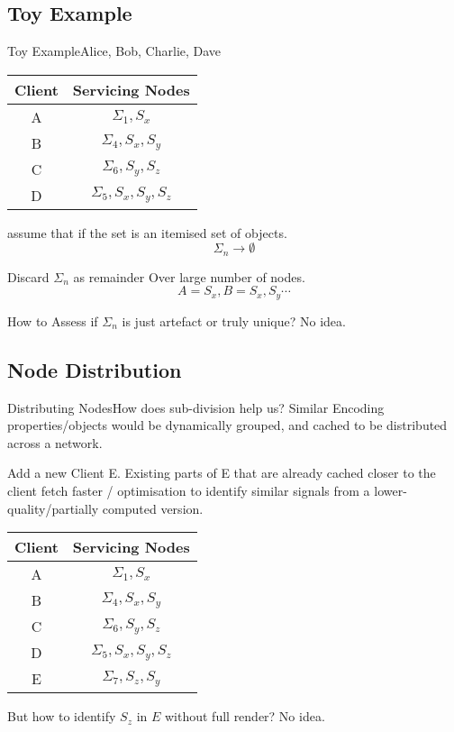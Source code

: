 \documentclass{beamer}
\begin{document}
	\subsection{Toy Example}
  \begin{frame}[t]{Toy Example}{Alice, Bob, Charlie, Dave}
    \vspace{.1cm}
    \begin{tabular}{|c|c|}
      \hline
      Client & Servicing Nodes \\
      \hline
      A & $\Sigma_{1},S_{x}$ \\
      B & $\Sigma_{4},S_{x},S_{y}$\\
      C & $\Sigma_{6},S_{y},S_{z}$\\
      D & $\Sigma_{5},S_{x},S_{y},S_{z}$\\
      \hline
    \end{tabular}
    \pause
    \begin{theorem}
      assume that if the set is  an itemised set of objects.
      \[\Sigma_{n} \to \emptyset \]

      Discard $\Sigma_{n}$ as remainder Over large number of nodes.
      \[ A = {S_{x}}, B = {S_{x},S_{y}} \cdots\]
      \pause

      How to Assess if $\Sigma_{n}$ is just artefact or truly unique? No idea.
    \end{theorem}
  \end{frame}
	\subsection{Node Distribution }
  \begin{frame}[t]{Distributing Nodes}{How does sub-division help us?}
    Similar Encoding properties/objects would be dynamically grouped, and cached to be distributed across a network.
    \pause
    \begin{example}


    Add a new Client E. Existing parts of E that are already cached closer to the client fetch faster / optimisation to identify similar signals from a lower-quality/partially computed version.

    \vspace{.2cm}

    \begin{tabular}{|c|c|}
      \hline
      Client & Servicing Nodes \\
      \hline
      A & $\Sigma_{1},S_{x}$ \\
      B & $\Sigma_{4},S_{x},S_{y}$\\
      C & $\Sigma_{6},S_{y},S_{z}$\\
      D & $\Sigma_{5},S_{x},S_{y},S_{z}$\\
      \hline
      E & $\Sigma_{7},S_{z},S_{y}$\\
          \hline
    \end{tabular}
  \end{example}
  \pause

  But how to identify $S_{z}$ in $E$ without full render? No idea.

\end{frame}
\end{document}
